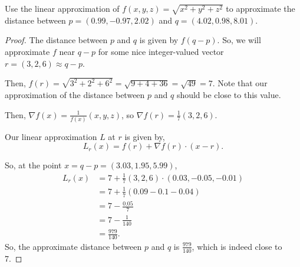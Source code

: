 \documentclass[../hw4]{subfiles}
\begin{document}
\begin{problem}[4]
Use the linear approximation of $f(x,y,z)=\sqrt{x^2 + y^2 + z^2}$ to approximate the distance between $p=(0.99,-0.97,2.02)$ and  $q=(4.02,0.98,8.01)$.
\end{problem}
\begin{proof}
	The distance between $p$ and  $q$ is given by  $f(q-p)$. So, we will approximate  $f$ near  $q-p$ for some nice integer-valued vector  $r=(3,2,6)\approx q-p$.

	Then, $f(r)=\sqrt{3^2+2^2+6^2}=\sqrt{9 + 4 + 36} = \sqrt{49} = 7$. Note that our approximation of the distance between $p$ and  $q$ should be close to this value.

	Then,  $\nabla f (x) = \frac{1}{f(x)}(x,y,z)$, so $\nabla f(r) = \frac{1}{7}(3,2,6) $.

	Our linear approximation $L$ at  $r$ is given by,  \[
		L_r(x)=f(r)+\nabla f(r)\cdot (x-r)
		.\]

	So, at the point $x=q-p=(3.03,1.95,5.99)$, \begin{align*}
		L_r(x) & =7+\frac{1}{7}(3,2,6)\cdot (0.03,-0.05,-0.01) \\
		       & = 7 + \frac{1}{7}(0.09-0.1-0.04)              \\
		       & = 7 - \frac{0.05}{7}                          \\
		       & = 7 - \frac{1}{140}                           \\
		       & = \frac{979}{140}
		.\end{align*}
	So, the approximate distance between $p$ and  $q$ is  $\frac{979}{140}$, which is indeed close to 7.
\end{proof}
\end{document}
